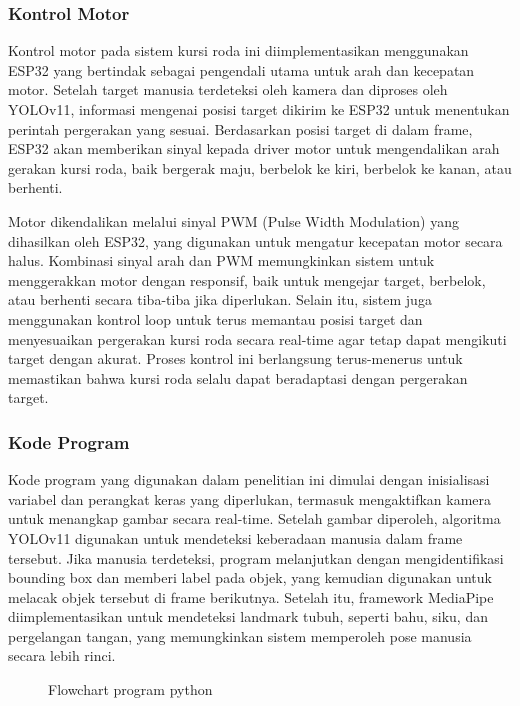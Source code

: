 \subsubsection{Kontrol Motor}
\label{subsubsec:kontrol_motor}

Kontrol motor pada sistem kursi roda ini diimplementasikan menggunakan ESP32 yang bertindak sebagai pengendali utama untuk arah dan kecepatan motor. Setelah target manusia terdeteksi oleh kamera dan diproses oleh YOLOv11, informasi mengenai posisi target dikirim ke ESP32 untuk menentukan perintah pergerakan yang sesuai. Berdasarkan posisi target di dalam frame, ESP32 akan memberikan sinyal kepada driver motor untuk mengendalikan arah gerakan kursi roda, baik bergerak maju, berbelok ke kiri, berbelok ke kanan, atau berhenti.

Motor dikendalikan melalui sinyal PWM (Pulse Width Modulation) yang dihasilkan oleh ESP32, yang digunakan untuk mengatur kecepatan motor secara halus. Kombinasi sinyal arah dan PWM memungkinkan sistem untuk menggerakkan motor dengan responsif, baik untuk mengejar target, berbelok, atau berhenti secara tiba-tiba jika diperlukan. Selain itu, sistem juga menggunakan kontrol loop untuk terus memantau posisi target dan menyesuaikan pergerakan kursi roda secara real-time agar tetap dapat mengikuti target dengan akurat. Proses kontrol ini berlangsung terus-menerus untuk memastikan bahwa kursi roda selalu dapat beradaptasi dengan pergerakan target.

\subsubsection{Kode Program}
\label{subsubsec:kode_program}

Kode program yang digunakan dalam penelitian ini dimulai dengan inisialisasi variabel dan perangkat keras yang diperlukan, termasuk mengaktifkan kamera untuk menangkap gambar secara real-time. Setelah gambar diperoleh, algoritma YOLOv11 digunakan untuk mendeteksi keberadaan manusia dalam frame tersebut. Jika manusia terdeteksi, program melanjutkan dengan mengidentifikasi bounding box dan memberi label pada objek, yang kemudian digunakan untuk melacak objek tersebut di frame berikutnya. Setelah itu, framework MediaPipe diimplementasikan untuk mendeteksi landmark tubuh, seperti bahu, siku, dan pergelangan tangan, yang memungkinkan sistem memperoleh pose manusia secara lebih rinci.

\begin{figure}[H]
  \centering
  \resizebox{1\linewidth}{!}{
    
  }
  \caption{Flowchart program python}
\end{figure}

